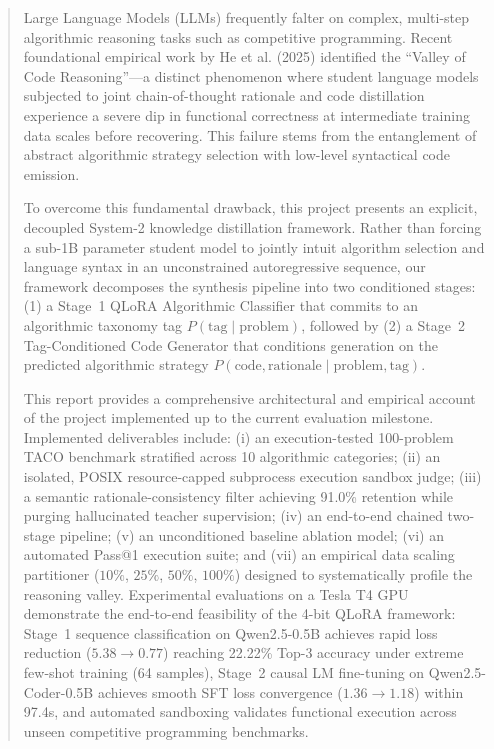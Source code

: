 \documentclass[lettersize,journal]{IEEEtran}
\begin{document}
\begin{abstract}
Large Language Models (LLMs) frequently falter on complex, multi-step algorithmic reasoning tasks such as competitive programming. Recent foundational empirical work by He et al. (2025) identified the ``Valley of Code Reasoning''---a distinct phenomenon where student language models subjected to joint chain-of-thought rationale and code distillation experience a severe dip in functional correctness at intermediate training data scales before recovering. This failure stems from the entanglement of abstract algorithmic strategy selection with low-level syntactical code emission. 

To overcome this fundamental drawback, this project presents an explicit, decoupled System-2 knowledge distillation framework. Rather than forcing a sub-1B parameter student model to jointly intuit algorithm selection and language syntax in an unconstrained autoregressive sequence, our framework decomposes the synthesis pipeline into two conditioned stages: (1) a Stage~1 QLoRA Algorithmic Classifier that commits to an algorithmic taxonomy tag $P(\text{tag} \mid \text{problem})$, followed by (2) a Stage~2 Tag-Conditioned Code Generator that conditions generation on the predicted algorithmic strategy $P(\text{code}, \text{rationale} \mid \text{problem}, \text{tag})$. 

This report provides a comprehensive architectural and empirical account of the project implemented up to the current evaluation milestone. Implemented deliverables include: (i) an execution-tested 100-problem TACO benchmark stratified across 10 algorithmic categories; (ii) an isolated, POSIX resource-capped subprocess execution sandbox judge; (iii) a semantic rationale-consistency filter achieving 91.0\% retention while purging hallucinated teacher supervision; (iv) an end-to-end chained two-stage pipeline; (v) an unconditioned baseline ablation model; (vi) an automated Pass@1 execution suite; and (vii) an empirical data scaling partitioner ($10\%$, $25\%$, $50\%$, $100\%$) designed to systematically profile the reasoning valley. Experimental evaluations on a Tesla T4 GPU demonstrate the end-to-end feasibility of the 4-bit QLoRA framework: Stage~1 sequence classification on Qwen2.5-0.5B achieves rapid loss reduction ($5.38 \to 0.77$) reaching 22.22\% Top-3 accuracy under extreme few-shot training (64 samples), Stage~2 causal LM fine-tuning on Qwen2.5-Coder-0.5B achieves smooth SFT loss convergence ($1.36 \to 1.18$) within 97.4s, and automated sandboxing validates functional execution across unseen competitive programming benchmarks.
\end{abstract}
\end{document}
